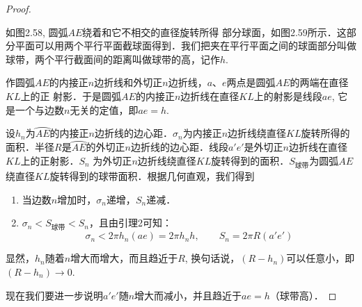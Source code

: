 \begin{proof}
\begin{figure}[htp]
    \caption{}
\end{figure}

如图2.58, 圆弧$AE$绕着和它不相交的直径旋转所得
部分球面，如图2.59所示．这部分平面可以用两个平行平面截球面得到．我们把夹在平行平面之间的球面部分叫做球带，两个平行截面间的距离叫做球带的高，记作$h$. 
\begin{figure}[htp]
    \centering
{}
    \caption{}
\end{figure}

作圆弧$AE$的内接正$n$边折线和外切正$n$边折线，$a$、$e$两点是圆弧$AE$的两端在直径$KL$上的正
射影．于是圆弧$AE$的内接正$n$边折线在直径$KL$上的射影是线段$ae$, 它是一个与边数$n$无关的定值，即$ae=h$.

设$h_n$为$\wideparen{AE}$的内接正$n$边折线的边心距．$\sigma_n$为内接正$n$边折线绕直径$KL$旋转所得的面积．半径$R$是$\wideparen{AE}$的外切正$n$边折线的边心距．线段$a'e'$是外切正$n$边折线在直径$KL$上的正射影．$S_n$ 为外切正$n$边折线绕直径$KL$旋转得到的面积．$S_{\text{球带}}$为圆弧$AE$绕直径$KL$旋转得到的球带面积．根据几何直观，我们得到
\begin{enumerate}
\item 当边数$n$增加时，$\sigma_n$递增，$S_n$递减．
\item $\sigma_n<S_{\text{球带}}<S_n$，且由引理2可知：
\[\sigma_n<2\pi h_n(ae)=2\pi h_n h,\qquad S_n =2\pi R (a'e')\]    
\end{enumerate}

显然，$h_n$随着$n$增大而增大，而且趋近于$R$, 换句话说，$(R-h_n)$可以任意小，即$(R-h_n)\to 0$. 

现在我们要进一步说明$a'e'$随$n$增大而减小，并且趋近于$ae=h$（球带高）．


\end{proof}
